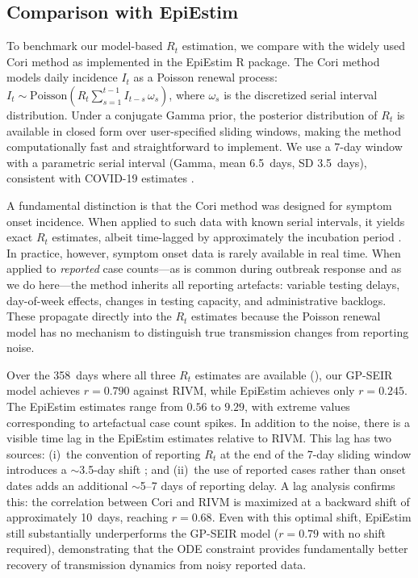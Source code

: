 \documentclass[11pt]{article}
\begin{document}
\subsection{Comparison with EpiEstim}\label{sec:results:epiestim}

To benchmark our model-based $R_t$ estimation, we compare with the widely used Cori method \citep{Cori2013,Thompson2019} as implemented in the EpiEstim R package. The Cori method models daily incidence $I_t$ as a Poisson renewal process: $I_t \sim \mathrm{Poisson}(R_t \sum_{s=1}^{t-1} I_{t-s}\, \omega_s)$, where $\omega_s$ is the discretized serial interval distribution. Under a conjugate Gamma prior, the posterior distribution of $R_t$ is available in closed form over user-specified sliding windows, making the method computationally fast and straightforward to implement. We use a 7-day window with a parametric serial interval (Gamma, mean 6.5~days, SD 3.5~days), consistent with COVID-19 estimates \citep{He2020}.

A fundamental distinction is that the Cori method was designed for symptom onset incidence. When applied to such data with known serial intervals, it yields exact $R_t$ estimates, albeit time-lagged by approximately the incubation period \citep{Cori2013}. In practice, however, symptom onset data is rarely available in real time. When applied to \emph{reported} case counts---as is common during outbreak response and as we do here---the method inherits all reporting artefacts: variable testing delays, day-of-week effects, changes in testing capacity, and administrative backlogs. These propagate directly into the $R_t$ estimates because the Poisson renewal model has no mechanism to distinguish true transmission changes from reporting noise.

Over the 358~days where all three $R_t$ estimates are available (), our GP-SEIR model achieves $r=0.790$ against RIVM, while EpiEstim achieves only $r=0.245$. The EpiEstim estimates range from $0.56$ to $9.29$, with extreme values corresponding to artefactual case count spikes. In addition to the noise, there is a visible time lag in the EpiEstim estimates relative to RIVM. This lag has two sources: (i)~the convention of reporting $R_t$ at the end of the 7-day sliding window introduces a $\sim$3.5-day shift \citep{Gostic2020}; and (ii)~the use of reported cases rather than onset dates adds an additional $\sim$5--7 days of reporting delay. A lag analysis confirms this: the correlation between Cori and RIVM is maximized at a backward shift of approximately 10~days, reaching $r=0.68$. Even with this optimal shift, EpiEstim still substantially underperforms the GP-SEIR model ($r=0.79$ with no shift required), demonstrating that the ODE constraint provides fundamentally better recovery of transmission dynamics from noisy reported data.
\end{document}
